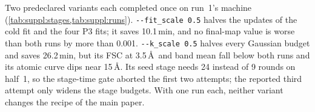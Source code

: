 Two predeclared variants each completed once on run~1's machine (\cref{tab:suppl:stages,tab:suppl:runs}).
\texttt{-{}-fit\_scale 0.5} halves the updates of the cold fit and the four P3 fits; it saves 10.1\,min, and no final-map value is worse than both runs by more than 0.001.
\texttt{-{}-k\_scale 0.5} halves every Gaussian budget and saves 26.2\,min, but its FSC at 3.5\,\AA\ and band mean fall below both runs and its atomic curve dips near 15\,\AA.
Its seed stage needs 24 instead of 9 rounds on half~1, so the stage-time gate aborted the first two attempts; the reported third attempt only widens the stage budgets.
With one run each, neither variant changes the recipe of the main paper.

